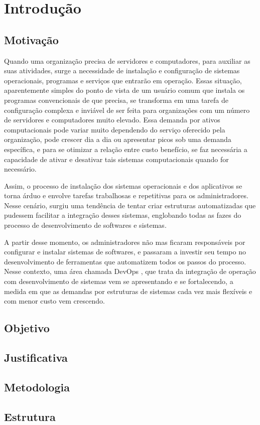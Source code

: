 \chapter{Introdução}

\section{Motivação}

Quando uma organização precisa de servidores e computadores, 
para auxiliar as suas atividades, surge a necessidade de 
instalação e configuração de sistemas operacionais, programas 
e serviços que entrarão em operação. Essas situação, 
aparentemente simples do ponto de vista de um usuário comum
que instala os programas convencionais de que precisa, se 
transforma em uma tarefa de configuração complexa e inviável 
de ser feita para organizações com um número de servidores e 
computadores muito elevado. Essa demanda por ativos 
computacionais pode variar muito dependendo do serviço 
oferecido pela organização, pode crescer dia a dia ou 
apresentar picos sob uma demanda específica, e para se 
otimizar a relação entre custo benefício, se faz necessária
a capacidade de ativar e desativar tais sistemas 
computacionais quando for necessário. 

Assim, o processo de  
instalação dos sistemas operacionais e dos aplicativos se 
torna árduo e envolve tarefas trabalhosas e repetitivas 
para os administradores. Nesse cenário, surgiu uma 
tendência de tentar criar estruturas automatizadas que 
pudessem facilitar a integração desses sistemas, englobando
todas as fazes do processo de desenvolvimento de softwares 
e sistemas. 

A partir desse momento, os administradores não 
mas ficaram responsáveis por configurar e instalar sistemas 
de softwares, e passaram a investir seu tempo no 
desenvolvimento de ferramentas que automatizem todos os 
passos do processo. Nesse contexto, uma área chamada 
DevOps \cite{loukides2012devops}, que trata  da integração 
de operação com desenvolvimento de sistemas vem se 
apresentando e se fortalecendo, a medida em que as demandas 
por estruturas de sistemas cada vez mais flexíveis e com 
menor custo vem crescendo.


\section{Objetivo}

\section{Justificativa}

\section{Metodologia}

\section{Estrutura}
